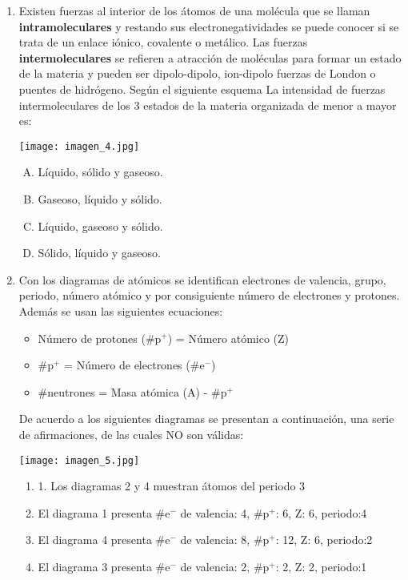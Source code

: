 \begin{enumerate}
\item Existen fuerzas al interior de los átomos de una molécula que se llaman \textbf{intramoleculares} y restando sus electronegatividades se puede conocer si se trata de un enlace iónico, covalente o metálico. Las fuerzas \textbf{intermoleculares} se refieren a atracción de moléculas para formar un estado de la materia y pueden ser dipolo-dipolo, ion-dipolo fuerzas de London o puentes de hidrógeno. Según el siguiente esquema La intensidad de fuerzas intermoleculares de los 3 estados de la materia organizada de menor a mayor es:\label{mon-6}

\begin{center}
\texttt{[image: imagen\_4.jpg]}
\end{center}

\begin{enumerate}[(A)]
\item Líquido, sólido y gaseoso.
\item Gaseoso, líquido y sólido.
\item Líquido, gaseoso y sólido.
\item Sólido, líquido y gaseoso.
\end{enumerate}


\item Con los diagramas de atómicos se identifican electrones de valencia, grupo, periodo, número atómico y por consiguiente número de electrones y protones. Además se usan las siguientes ecuaciones: \label{mon-7}

\begin{itemize}
\item Número de protones (\#p$^+$) = Número atómico (Z)
\item \#p$^+$ = Número de electrones (\#e$^-$)
\item \#neutrones = Masa atómica (A) - \#p$^+$
\end{itemize}

De acuerdo a los siguientes diagramas se presentan a continuación, una serie de afirmaciones, de las cuales NO son válidas:

\texttt{[image: imagen\_5.jpg]}
\justifying

\begin{enumerate}[I]
\item 1. Los diagramas 2 y 4 muestran átomos del periodo 3 
\item El diagrama 1 presenta \#e$^-$ de valencia: 4,  \#p$^+$: 6,  Z: 6, periodo:4
\item El diagrama 4 presenta \#e$^-$ de valencia: 8,  \#p$^+$: 12,  Z: 6, periodo:2
\item El diagrama 3 presenta \#e$^-$ de valencia: 2,  \#p$^+$: 2,  Z: 2, periodo:1
\end{enumerate}


\end{enumerate}
